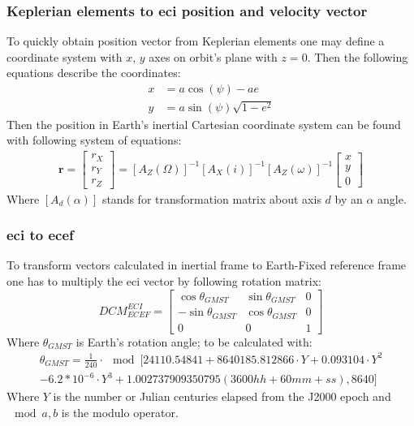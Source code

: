     \subsubsection{Keplerian elements to \ac{eci} position and velocity vector}
        To quickly obtain position vector from Keplerian elements one may define a coordinate system with $x$, $y$ axes on orbit's plane with $z=0$. Then the following equations describe the coordinates:
        \begin{align}
            x & = a\cos(\psi) -ae \\
            y &= a\sin(\psi)\sqrt{1-e^2}
        \end{align}
        Then the position in Earth's inertial Cartesian coordinate system can be found with following system of equations:
        \begin{align}
            \textbf{r} = \begin{bmatrix} r_X\\ r_Y\\ r_Z \end{bmatrix} = [A_Z(\Omega)]^{-1} [A_X(i)]^{-1} [A_Z(\omega)]^{-1} \begin{bmatrix} x\\ y\\ 0 \end{bmatrix}
        \end{align}
        Where $[A_d(\alpha)]$ stands for transformation matrix about axis $d$ by an $\alpha$ angle.

    \subsubsection{\ac{eci} to \ac{ecef}}
        To transform vectors calculated in inertial frame to Earth-Fixed reference frame one has to multiply the \ac{eci} vector by following rotation matrix:
        \begin{equation}
            DCM^{ECI}_{ECEF} = \begin{bmatrix} \cos\theta_{GMST} & \sin\theta_{GMST} & 0\\
            -\sin\theta_{GMST} & \cos\theta_{GMST} & 0 \\
            0 & 0 & 1 \end{bmatrix}
        \end{equation}
        Where $\theta_{GMST}$ is Earth's rotation angle; to be calculated with:
        \begin{multline}
        \theta_{GMST}= \frac{1}{240} \cdot \mod[24110.54841 + 8640185.812866 \cdot Y + 0.093104 \cdot Y^2 \\
            - 6.2*10^{-6} \cdot Y^3 + 1.002737909350795\left(3600hh+60mm+ss\right), 8640]
        \end{multline}
        Where $Y$ is the number or Julian centuries elapsed from the J2000 epoch and $\mod{a,b}$ is the modulo operator.

